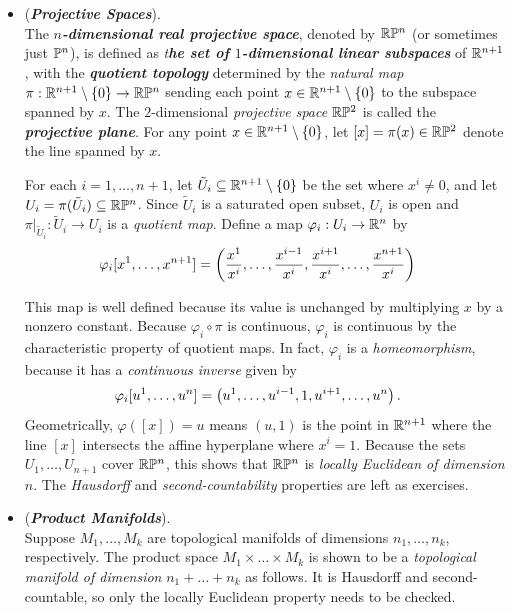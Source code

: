 \documentclass[11pt]{article}
\begin{document}
\begin{itemize}
\item \begin{example} (\emph{\textbf{Projective Spaces}}).\\
The \emph{\textbf{$n$-dimensional real projective space}}, denoted by ${\mathbb R}{\mathbb P}^n$ (or sometimes just ${\mathbb P}^n$), is defined as \emph{t\textbf{he set of $1$-dimensional linear subspaces}} of ${\mathbb R}^{n+1}$, with the \emph{\textbf{quotient topology}} determined by the \emph{natural map} $\pi: {\mathbb R}^{n+1} \setminus \left\{0\right\} \rightarrow {\mathbb R}{\mathbb P}^n$ sending each point $x \in  {\mathbb R}^{n+1} \setminus \left\{0\right\}$ to the subspace spanned by $x$. The $2$-dimensional \emph{projective space} ${\mathbb R}{\mathbb P}^2$ is called the \emph{\textbf{projective plane}}. For any point $x \in  {\mathbb R}^{n+1} \setminus \left\{0\right\}$, let $[x] = \pi(x) \in {\mathbb R}{\mathbb P}^2$ denote the line spanned by $x$.

For each $i=1,\ldots, n+1$, let $\tilde{U}_i \subseteq  {\mathbb R}^{n+1} \setminus \left\{0\right\}$ be the set where $x^i \neq 0$, and let $U_i = \pi(\tilde{U}_i) \subseteq {\mathbb R}{\mathbb P}^n$. Since $\tilde{U}_i$ is a saturated open subset, $U_i$ is open and
$\pi \big|_{\tilde{U}_i}: \tilde{U}_i \rightarrow U_i$ is a \emph{quotient map}. Define a map $\varphi_i: U_i \rightarrow {\mathbb R}^n$
by
\begin{align*}
\varphi_{i}[x^1, \ldots, x^{n+1}] &= \left(\frac{x^1}{x^{i}}, \ldots, \frac{x^{i-1}}{x^{i}}, \frac{x^{i+1}}{x^{i}},\ldots, \frac{x^{n+1}}{x^{i}}\right)
\end{align*}

This map is well defined because its value is unchanged by multiplying $x$ by a nonzero constant. Because $\varphi_i \circ \pi$ is continuous, $\varphi_i$ is continuous by the characteristic property of quotient maps. In fact, $\varphi_i$ is a \emph{homeomorphism}, because it has a \emph{continuous inverse} given by
\begin{align*}
\varphi_{i}[u^1, \ldots, u^{n}] &= \left(u^1, \ldots, u^{i-1}, 1, u^{i+1}, \ldots, u^{n}\right).
\end{align*} 
Geometrically, $\varphi([x]) = u$ means $(u, 1)$ is the point in ${\mathbb R}^{n+1}$ where the line $[x]$ intersects the affine hyperplane where $x^i = 1$.  Because the sets $U_1,\ldots, U_{n+1}$ cover ${\mathbb R}{\mathbb P}^n$, this shows that ${\mathbb R}{\mathbb P}^n$ is \emph{locally Euclidean of dimension $n$}. The \emph{Hausdorff} and \emph{second-countability} properties are left as exercises.
\end{example}

\item \begin{example} (\emph{\textbf{Product Manifolds}}).\\
 Suppose $M_1 ,\ldots, M_k$ are topological manifolds of dimensions $n_1,\ldots,n_k$, respectively. The product space $M_1 \times \ldots \times M_k$ is shown to be a \emph{topological manifold of dimension} $n_1 + \ldots + n_k$ as follows. It is Hausdorff and second-countable, so only the locally Euclidean property needs to be checked. 
 

\end{example}
\end{itemize}
\end{document}
